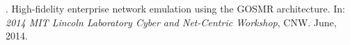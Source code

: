 \begin{innerlist}

\item[] \myname.
	High-fidelity enterprise network emulation using the GOSMR architecture.
	In: \emph{2014 MIT Lincoln Laboratory Cyber and Net-Centric Workshop}, CNW.
	June, 2014.
	
\end{innerlist}
